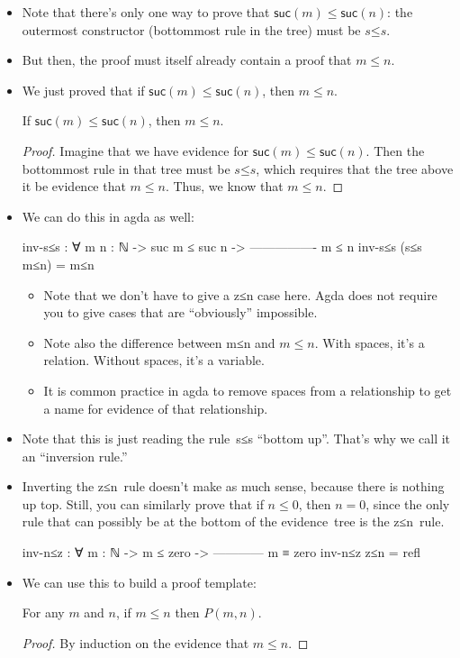 \documentclass{lecturenotes}
\begin{document}
\begin{itemize}
\item Note that there's only one way to prove that $\textsf{suc}(m) \leq \textsf{suc}(n)$: the outermost constructor (bottommost rule in the tree) must be $s\mathord{\leq}s$.
\item But then, the proof must itself already contain a proof that $m \leq n$.
\item We just proved that if $\textsf{suc}(m) \leq \textsf{suc}(n)$, then $m \leq n$.
  \begin{thm}
    If $\textsf{suc}(m) \leq \textsf{suc}(n)$, then $m \leq n$.
  \end{thm}
  \begin{proof}
    Imagine that we have evidence for $\textsf{suc}(m) \leq \textsf{suc}(n)$.
    Then the bottommost rule in that tree must be $s\mathord{\leq}s$, which requires that the tree above it be evidence that $m \leq n$.
    Thus, we know that $m \leq n$.
  \end{proof}
  \pagebreak
\item We can do this in agda as well:
\begin{code}
inv-s≤s : ∀ {m n : ℕ} ->
          suc m ≤ suc n ->
          ----------------
               m ≤ n
inv-s≤s (s≤s m≤n) = m≤n
\end{code}
\begin{itemize}
\item Note that we don't have to give a \textsf{z≤n} case here.
  Agda does not require you to give cases that are ``obviously'' impossible.
\item Note also the difference between \textsf{m≤n} and $m \le n$.
  With spaces, it's a relation.
  Without spaces, it's a variable.
\item It is common practice in agda to remove spaces from a relationship to get a name for evidence of that relationship.
\end{itemize}
\item Note that this is just reading the rule~\textsf{s≤s} ``bottom up''.
  That's why we call it an ``inversion rule.''
\item Inverting the \textsf{z≤n}~rule doesn't make as much sense, because there is nothing up top.
  Still, you can similarly prove that if $n \leq 0$, then $n = 0$, since the only rule that can possibly be at the bottom of the evidence~tree is the \textsf{z≤n}~rule.
\begin{code}
inv-n≤z : ∀ {m : ℕ} ->
            m ≤ zero ->
          ------------
            m ≡ zero
inv-n≤z z≤n = refl
\end{code}
\item We can use this to build a proof template:
  \begin{thm}
    For any $m$ and $n$, if $m \le n$ then $P(m, n)$.
  \end{thm}
  \begin{proof}
    By induction on the evidence that $m \leq n$.


\end{proof}
\end{itemize}
\end{document}
